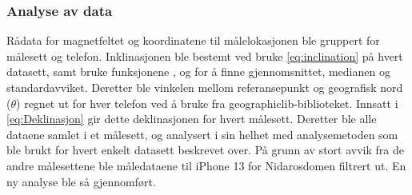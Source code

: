\subsubsection{Analyse av data}
Rådata for magnetfeltet og koordinatene til målelokasjonen ble gruppert for målesett og telefon.
Inklinasjonen ble bestemt ved bruke \eqref{eq:inclination} på hvert datasett, samt bruke funksjonene 
\href{https://numpy.org/doc/stable/reference/generated/numpy.mean.html#numpy.mean}{}, 
\href{https://numpy.org/doc/stable/reference/generated/numpy.median.html#numpy-median}{} og 
\href{https://docs.scipy.org/doc/scipy/reference/generated/scipy.stats.tstd.html#scipy.stats.tstd}
{} for å finne gjennomsnittet, medianen og 
standardavviket.
Deretter ble vinkelen mellom referansepunkt og geografisk nord ($\theta$) regnet ut for hver telefon ved å 
bruke  fra geographiclib-biblioteket.
Innsatt i \eqref{eq:Deklinasjon} gir dette deklinasjonen for hvert målesett.
Deretter ble alle dataene samlet i et målesett, og analysert i sin helhet med analysemetoden som ble brukt 
for hvert enkelt datasett beskrevet over.
På grunn av stort avvik fra de andre målesettene ble måledataene til iPhone 13 for Nidarosdomen filtrert ut. En ny analyse ble så gjennomført. 